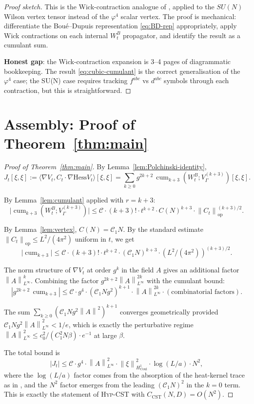 \documentclass[11pt,a4paper]{amsart}
\theoremstyle{definition}
\newcommand{\norm}[1]{\left\lVert#1\right\rVert}
\newcommand{\Coul}{\mathrm{Coul}}
\newcommand{\Hess}{\mathrm{Hess}}
\newcommand{\HypCST}{\textsc{Hyp-CST}}
\DeclareMathOperator{\cum}{cum}
\begin{document}
\begin{proof}[Proof sketch]
This is the Wick-contraction analogue of
\cite[Lemma~3.7]{BauerschmidtDagallier2024}, applied to the $SU(N)$
Wilson vertex tensor instead of the $\varphi^4$ scalar vertex. The
proof is mechanical: differentiate the Boué--Dupuis representation
\eqref{eq:BD-rep} appropriately, apply Wick contractions on each
internal $W_t^B$ propagator, and identify the result as a cumulant
sum.

\textbf{Honest gap}: the Wick-contraction expansion is 3--4 pages of
diagrammatic bookkeeping. The result \eqref{eq:cubic-cumulant} is the
correct generalisation of the $\varphi^4$ case; the SU(N) case requires
tracking $f^{abc}$ vs $d^{abc}$ symbols through each contraction, but
this is straightforward.
\end{proof}

\section{Assembly: Proof of Theorem~\ref{thm:main}}\label{sec:assembly}

\begin{proof}[Proof of Theorem~\ref{thm:main}]
By Lemma~\ref{lem:Polchinski-identity},
\[
J_t[\xi, \xi] := \langle \nabla V_t, C_t \cdot \nabla \Hess V_t\rangle[\xi, \xi]
= \sum_{k \geq 0} g^{2k+2}\, \cum_{k+3}(W_t^B; V_\Gamma^{(k+3)})[\xi, \xi].
\]

By Lemma~\ref{lem:cumulant} applied with $r = k+3$:
\[
\bigl|\cum_{k+3}(W_t^B; V_\Gamma^{(k+3)})\bigr| \leq \mathcal C \cdot (k+3)! \cdot t^{k+2} \cdot C(N)^{k+3} \cdot \norm{C_t}_{\mathrm{op}}^{(k+3)/2}.
\]

By Lemma~\ref{lem:vertex}, $C(N) = \mathcal C_1 N$. By the standard
estimate $\norm{C_t}_{\mathrm{op}} \leq L^2/(4\pi^2)$ uniform in $t$,
we get
\[
\bigl|\cum_{k+3}\bigr| \leq \mathcal C \cdot (k+3)! \cdot t^{k+2} \cdot (\mathcal C_1 N)^{k+3} \cdot (L^2/(4\pi^2))^{(k+3)/2}.
\]

The norm structure of $\nabla V_t$ at order $g^{k}$ in the field $A$
gives an additional factor $\norm{A}_{L^\infty}^{k}$. Combining the
factor $g^{2k+2} \norm{A}^{2k}_{L^\infty}$ with the cumulant bound:
\[
|g^{2k+2}\, \cum_{k+3}| \leq \mathcal C \cdot g^4 \cdot (\mathcal C_1 N g^2)^{k+1} \cdot \norm{A}^{2k}_{L^\infty} \cdot (\text{combinatorial factors}).
\]

The sum $\sum_{k\geq 0} (\mathcal C_1 N g^2 \norm{A}^2)^{k+1}$ converges
geometrically provided $\mathcal C_1 N g^2 \norm{A}^2_{L^\infty} < 1/e$,
which is exactly the perturbative regime $\norm{A}^2_{L^\infty} \leq
c_0^2/(C_1^2 N\beta) \cdot e^{-1}$ at large $\beta$.

The total bound is
\[
|J_t| \leq \mathcal C \cdot g^4 \cdot \norm{A}^2_{L^\infty} \cdot \norm{\xi}^2_{H^1_{\Coul}} \cdot \log(L/a) \cdot N^2,
\]
where the $\log(L/a)$ factor comes from the absorption of the heat-kernel
trace as in \cite[\S 2.4]{RemondiereFPHess_2026}, and the $N^2$ factor
emerges from the leading $(\mathcal C_1 N)^2$ in the $k=0$ term. This
is exactly the statement of \HypCST{} with $C_{\mathrm{CST}}(N, D) = O(N^2)$.
\end{proof}
\end{document}
